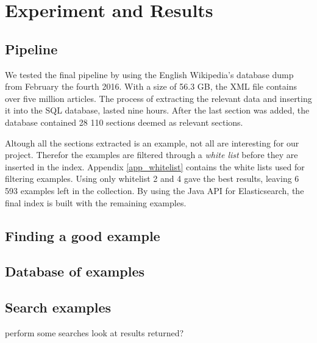 
\chapter{Experiment and Results}

\section{Pipeline}
We tested the final pipeline by using the English Wikipedia's database dump from February the fourth 2016. With a size of 56.3 GB, the XML file contains over five million articles. The process of extracting the relevant data and inserting it into the SQL database, lasted nine hours. After the last section was added, the database contained 28 110 sections deemed as relevant sections.

Altough all the sections extracted is an example, not all are interesting for our project. Therefor the examples are filtered through a \textit{white list} before they are inserted in the index. Appendix \ref{app_whitelist} contains the white lists used for filtering examples.
Using only whitelist 2 and 4 gave the best results, leaving 6 593 examples left in the collection. By using the Java API for Elasticsearch, the final index is built with the remaining examples.

\section{Finding a good example}



\section{Database of examples}



\section{Search examples}

perform some searches look at results returned?

\cleardoublepage
